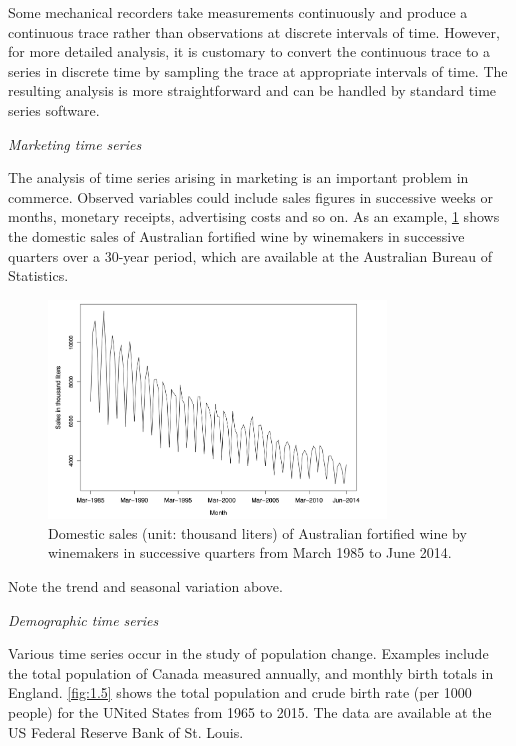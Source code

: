 Some mechanical recorders take measurements continuously and produce a continuous trace rather than observations at discrete intervals of time. However, for more detailed analysis, it is customary to convert the continuous trace to a series in discrete time by sampling the trace at appropriate intervals of time. The resulting analysis is more straightforward and can be handled by standard time series software.

\textit{Marketing time series}

The analysis of time series arising in marketing is an important problem in commerce. Observed variables could include sales figures in successive weeks or months, monetary receipts, advertising costs and so on. As an example, 
\cref{fig:1.4} shows the domestic sales of Australian fortified wine by winemakers in successive quarters over a 30-year period, which are available at the Australian Bureau of Statistics.

\begin{figure}[ht]
	\centering
	\includegraphics[width=0.8\textwidth]{Chapter 1/fig1-4.png}
	\caption{Domestic sales (unit: thousand liters) of Australian fortified wine by winemakers in successive quarters from March 1985 to June 2014.}
	\label{fig:1.4}
\end{figure}

Note the trend and seasonal variation above.

\textit{Demographic time series}

Various time series occur in the study of population change. Examples include the total population of Canada measured annually, and monthly birth totals in England. \cref{fig:1.5} shows the total population and crude birth rate (per 1000 people) for the UNited States from 1965 to 2015. The data are available at the US Federal Reserve Bank of St. Louis.

